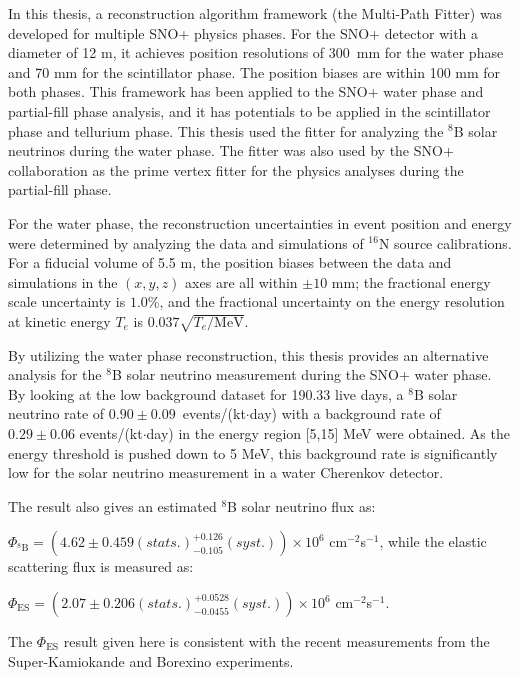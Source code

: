 In this thesis, a reconstruction algorithm framework (the Multi-Path Fitter) was developed for multiple SNO+ physics phases. For the SNO+ detector with a diameter of 12 m, it achieves position resolutions of 300~mm for the water phase and 70 mm for the scintillator phase. The position biases are within 100 mm for both phases. This framework has been
applied to the SNO+ water phase and partial-fill phase analysis, and it has potentials to be applied in the scintillator phase and tellurium phase. This thesis used the fitter for analyzing the $^8$B solar neutrinos during the water phase. The fitter was also used by the SNO+ collaboration as the prime vertex fitter for the physics analyses during the partial-fill phase.

For the water phase, the reconstruction uncertainties in event position and energy were determined by analyzing the data and simulations of $^{16}$N source calibrations. For a fiducial volume of 5.5 m, the position biases between the data and simulations in the $(x,y,z)$ axes are all within $\pm10$ mm; the fractional energy scale uncertainty is $1.0$\%, and the fractional uncertainty on the energy resolution at kinetic energy $T_e$ is $0.037\sqrt{T_e/\mathrm{MeV}}$.

By utilizing the water phase reconstruction, this thesis provides an alternative analysis for the $^8$B solar neutrino measurement during the SNO+ water phase. By looking at the low background dataset for 190.33 live days, a $^8$B solar neutrino rate of $0.90\pm0.09$~events/(kt$\cdot$day) with a background rate of $0.29\pm 0.06$ events/(kt$\cdot$day) in the energy region [5,15] MeV were obtained. As the energy threshold is pushed down to 5 MeV, this background rate is significantly low for the solar neutrino measurement in a water Cherenkov detector.

The result also gives an estimated $^8$B solar neutrino flux as: 

$\Phi_{\mathrm{^8B}}=(4.62 \pm 0.459 (stats.)^{+0.126}_{-0.105}(syst.))\times10^6$ cm$^{-2}$s$^{-1}$, 
while the elastic scattering flux is measured as: 

$\Phi_{\mathrm{ES}}=(2.07 \pm 0.206(stats.)^{+0.0528}_{-0.0455}(syst.))\times10^6$ cm$^{-2}$s$^{-1}$.

The $\Phi_{\mathrm{ES}}$ result given here is consistent with the recent measurements from the Super-Kamiokande and Borexino experiments.